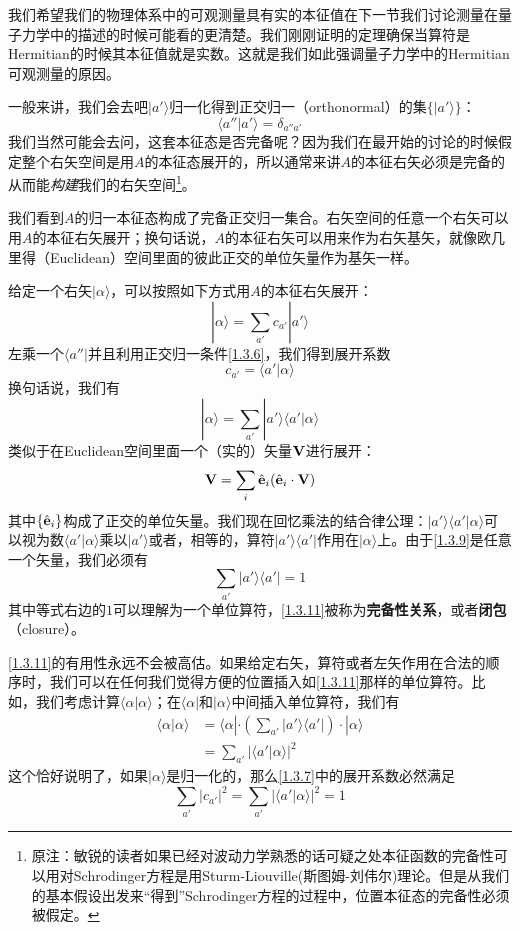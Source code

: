 \documentclass[UTF8,twoside]{ctexart}
\def\be{\begin{equation}}
\def\ee{\end{equation}}
\begin{document}
我们希望我们的物理体系中的可观测量具有实的本征值在下一节我们讨论测量在量子力学中的描述的时候可能看的更清楚。我们刚刚证明的定理确保当算符是Hermitian的时候其本征值就是实数。这就是我们如此强调量子力学中的Hermitian可观测量的原因。

一般来讲，我们会去吧$|a'\rangle$归一化得到正交归一（orthonormal）的集$\{|a'\rangle\}$：
\be\label{1.3.6}
\langle a''|a'\rangle = \delta_{a''a'}
\ee
我们当然可能会去问，这套本征态是否完备呢？因为我们在最开始的讨论的时候假定整个右矢空间是用$A$的本征态展开的，所以通常来讲$A$的本征右矢必须是完备的从而能{\it 构建}我们的右矢空间\footnote{原注：敏锐的读者如果已经对波动力学熟悉的话可疑之处本征函数的完备性可以用对Schrodinger方程是用Sturm-Liouville(斯图姆-刘伟尔)理论。但是从我们的基本假设出发来``得到''Schrodinger方程的过程中，位置本征态的完备性必须被假定。}。\\


\noindent 我们看到$A$的归一本征态构成了完备正交归一集合。右矢空间的任意一个右矢可以用$A$的本征右矢展开；换句话说，$A$的本征右矢可以用来作为右矢基矢，就像欧几里得（Euclidean）空间里面的彼此正交的单位矢量作为基矢一样。

给定一个右矢$|\alpha\rangle$，可以按照如下方式用$A$的本征右矢展开：
\be\label{1.3.7}
|\alpha\rangle = \sum_{a'}c_{a'}|a'\rangle
\ee
左乘一个$\langle a''|$并且利用正交归一条件\eqref{1.3.6}，我们得到展开系数
\be
c_{a'} = \langle a'|\alpha\rangle
\ee
换句话说，我们有
\be\label{1.3.9}
|\alpha\rangle = \sum_{a'}|a'\rangle\langle a'|\alpha\rangle
\ee
类似于在Euclidean空间里面一个（实的）矢量$\bf V$进行展开：
\be
{\bf V} = \sum_i\hat{\bf e}_i(\hat{\bf e}_i\cdot\bf V)
\ee
其中$\{\hat{\bf e}_i\}$构成了正交的单位矢量。我们现在回忆乘法的结合律公理：$|a'\rangle\langle a'|\alpha\rangle$可以视为数$\langle a'|\alpha\rangle$乘以$|a'\rangle$或者，相等的，算符$|a'\rangle\langle a'|$作用在$|\alpha\rangle$上。由于\eqref{1.3.9}是任意一个矢量，我们必须有
\be\label{1.3.11}
\sum_{a'}|a'\rangle\langle a'| = 1
\ee
其中等式右边的$1$可以理解为一个单位算符，\eqref{1.3.11}被称为{\bf 完备性关系}，或者{\bf 闭包}（closure）。

\eqref{1.3.11}的有用性永远不会被高估。如果给定右矢，算符或者左矢作用在合法的顺序时，我们可以在任何我们觉得方便的位置插入如\eqref{1.3.11}那样的单位算符。比如，我们考虑计算$\langle\alpha|\alpha\rangle$；在$\langle\alpha|$和$|\alpha\rangle$中间插入单位算符，我们有
\be
\begin{split}
\langle\alpha|\alpha\rangle&=\langle\alpha|\cdot\left(\sum_{a'}|a'\rangle\langle a'|\right)\cdot|\alpha\rangle\\
&=\sum_{a'}|\langle a'|\alpha\rangle|^2
\end{split}
\ee
这个恰好说明了，如果$|\alpha\rangle$是归一化的，那么\eqref{1.3.7}中的展开系数必然满足
\be
\sum_{a'}|c_{a'}|^2 = \sum_{a'}|\langle a'|\alpha\rangle|^2 = 1
\ee
\end{document}
